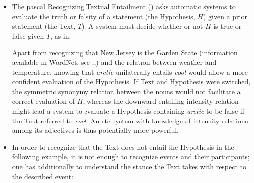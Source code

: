 \documentclass[10pt]{article}
\begin{document}
\begin{itemize}
 \item The {\sc pascal} Recognizing Textual Entailment (\cite{dagan+glickman+magnini:2005}) asks automatic systems to evaluate the truth or falsity of a 
statement (the Hypothesis, $H$) given a prior statement (the Text, $T$). A system must decide whether or not $H$ is true or false given $T$, as in:


Apart from recognizing that New Jersey is the Garden State (information available in WordNet, see \cite{clark2007role},\cite{clark2008augmenting},\cite{clark2008using}) and the relation between weather and temperature, 
knowing that \emph{arctic} unilaterally entails \emph{cool} would allow a more confident evaluation of the Hypothesis. 
If Text and Hypothesis were switched, the symmetric synonymy relation between the nouns would not facilitate a correct 
evaluation of $H$, whereas the downward entailing intensity relation might lead a system to evaluate a Hypothesis containing \emph{arctic} to be false if the Text referred to \emph{cool}. An {\sc rte} system with knowledge of intensity relations among 
its adjectives is thus potentially more powerful. 

\item In order to recognize that the Text does not entail the Hypothesis in the following example, it is not enough to recognize events and their participants;  one has additionally to understand the stance the Text takes with respect to the described event:



\end{itemize}
\end{document}
